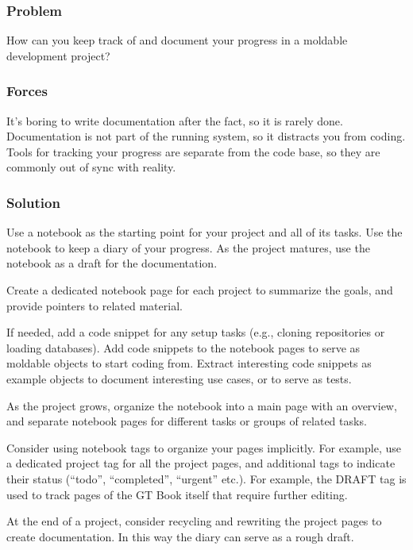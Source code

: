 \documentclass[sigconf]{acmart}
\begin{document}
\subsubsection*{Problem}
How can you keep track of and document your progress in a moldable development project?

\subsubsection*{Forces}
It's boring to write documentation after the fact, so it is rarely done.
Documentation is not part of the running system, so it distracts you from coding.
Tools for tracking your progress are separate from the code base, so they are commonly out of sync with reality.

\subsubsection*{Solution}
Use a notebook as the starting point for your project and all of its tasks. Use the notebook to keep a diary of your progress. As the project matures, use the notebook as a draft for the documentation.

Create a dedicated notebook page for each project to summarize the goals, and provide pointers to related material.

If needed, add a code snippet for any setup tasks (e.g., cloning repositories or loading databases). Add code snippets to the notebook pages to serve as moldable objects to start coding from. Extract interesting code snippets as example objects to document interesting use cases, or to serve as tests.

As the project grows, organize the notebook into a main page with an overview, and separate notebook pages for different tasks or groups of related tasks.

Consider using notebook tags to organize your pages implicitly. For example, use a dedicated project tag for all the project pages, and additional tags to indicate their status (``todo'', ``completed'', ``urgent'' etc.). For example, the DRAFT tag is used to track pages of the GT Book itself that require further editing.

At the end of a project, consider recycling and rewriting the project pages to create documentation. In this way the diary can serve as a rough draft.

\end{document}
